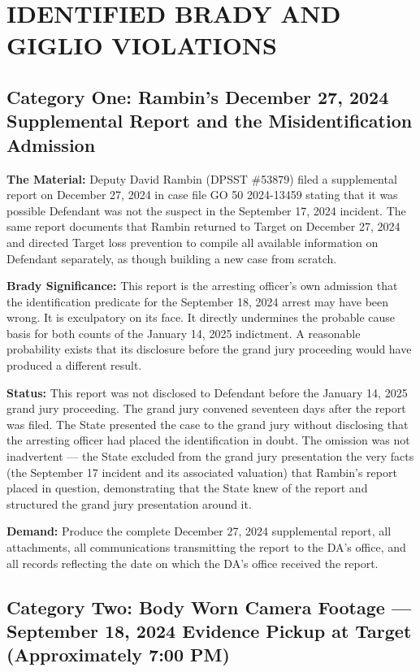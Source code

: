 \documentclass[12pt,letterpaper]{extarticle}
\begin{document}
\section{IDENTIFIED BRADY AND GIGLIO VIOLATIONS}

\subsection{Category One: Rambin's December 27, 2024 Supplemental Report and
the Misidentification Admission}

\textbf{The Material:} Deputy David Rambin (DPSST \#53879) filed a supplemental
report on December 27, 2024 in case file GO 50 2024-13459 stating that it was
possible Defendant was not the suspect in the September 17, 2024 incident. The
same report documents that Rambin returned to Target on December 27, 2024 and
directed Target loss prevention to compile all available information on Defendant
separately, as though building a new case from scratch.

\textbf{Brady Significance:} This report is the arresting officer's own admission
that the identification predicate for the September 18, 2024 arrest may have been
wrong. It is exculpatory on its face. It directly undermines the probable cause
basis for both counts of the January 14, 2025 indictment. A reasonable probability
exists that its disclosure before the grand jury proceeding would have produced a
different result.

\textbf{Status:} This report was not disclosed to Defendant before the January 14,
2025 grand jury proceeding. The grand jury convened seventeen days after the report
was filed. The State presented the case to the grand jury without disclosing that
the arresting officer had placed the identification in doubt. The omission was not
inadvertent --- the State excluded from the grand jury presentation the very facts
(the September 17 incident and its associated valuation) that Rambin's report
placed in question, demonstrating that the State knew of the report and structured
the grand jury presentation around it.

\textbf{Demand:} Produce the complete December 27, 2024 supplemental report,
all attachments, all communications transmitting the report to the DA's office,
and all records reflecting the date on which the DA's office received the report.

\subsection{Category Two: Body Worn Camera Footage --- September 18, 2024
Evidence Pickup at Target (Approximately 7:00 PM)}
\end{document}
